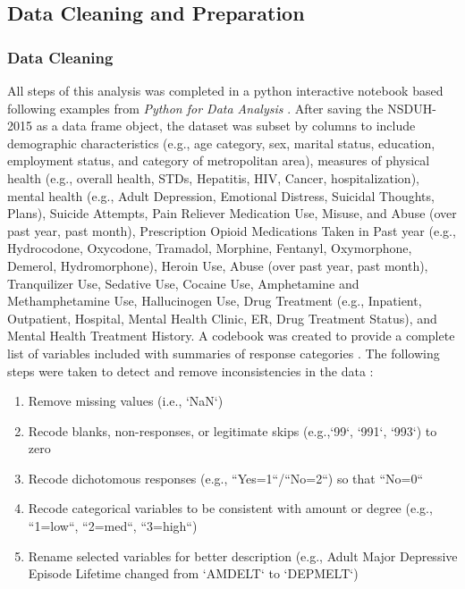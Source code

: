 \documentclass[sigconf]{acmart}
\begin{document}
\subsection{Data Cleaning and Preparation }

\subsubsection{Data Cleaning}
All steps of this analysis was completed in a python interactive notebook 
\cite{data17} based following examples from \emph{Python for Data Analysis}
\cite{mckinney17}. After saving the NSDUH-2015 as a data frame object, the 
dataset was subset by columns to include demographic characteristics (e.g., 
age category, sex, marital status, education, employment status, and category 
of metropolitan area), measures of physical health (e.g., overall health, 
STDs, Hepatitis, HIV, Cancer, hospitalization), mental health (e.g., Adult 
Depression, Emotional Distress, Suicidal Thoughts, Plans), Suicide Attempts, 
Pain Reliever Medication Use, Misuse, and Abuse (over past year, past month), 
Prescription Opioid Medications Taken in Past year (e.g., Hydrocodone, 
Oxycodone, Tramadol, Morphine, Fentanyl, Oxymorphone, Demerol, Hydromorphone), 
Heroin Use, Abuse (over past year, past month), Tranquilizer Use, Sedative Use, 
Cocaine Use, Amphetamine and Methamphetamine Use, Hallucinogen Use, Drug 
Treatment (e.g., Inpatient, Outpatient, Hospital, Mental Health Clinic, ER, 
Drug Treatment Status), and Mental Health Treatment History. A codebook was 
created to provide a complete list of variables included with summaries 
of response categories \cite{codebook17}. The following steps were taken 
to detect and remove inconsistencies in the data \cite{rahm00}:
\begin{enumerate}
  \item Remove missing values (i.e., `NaN`) 
  \item Recode blanks, non-responses, or legitimate skips (e.g.,`99`, `991`, 
  `993`) to zero  
  \item Recode dichotomous responses (e.g., ``Yes=1``/``No=2``) so that ``No=0``
  \item Recode categorical variables to be consistent with amount or degree 
  (e.g., ``1=low``, ``2=med``, ``3=high``)
   \item Rename selected variables for better description (e.g., 
   Adult Major Depressive Episode Lifetime changed from `AMDELT` to `DEPMELT`)
\end{enumerate}
\end{document}
